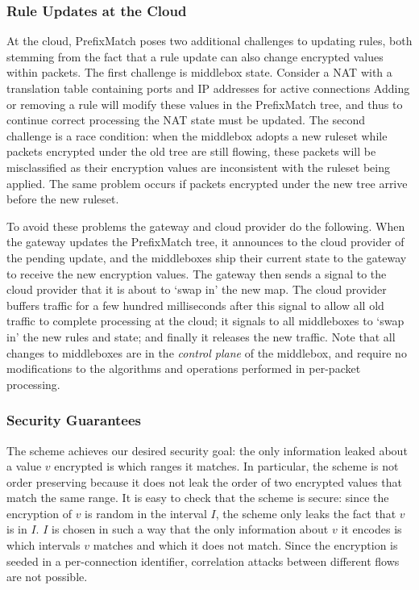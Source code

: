 \subsubsection{Rule Updates at the Cloud}
\label{sec:updates}
At the cloud, PrefixMatch poses two additional challenges to updating rules, both stemming from the fact that a rule update can also change encrypted values within packets.
The first challenge is middlebox state. Consider a NAT with a translation table containing ports and IP addresses for active connections
Adding or removing a rule will modify these values in the PrefixMatch tree, and thus to continue correct processing the NAT state must be updated.
The second challenge is a race condition: when the middlebox adopts a new ruleset while packets encrypted under the old tree are still flowing, these packets will be misclassified as their encryption values are inconsistent with the ruleset being applied. 
The same problem occurs if packets encrypted under the new tree arrive before the new ruleset.

To avoid these problems the gateway and cloud provider do the following. 
When the gateway updates the PrefixMatch tree, it announces to the cloud provider of the pending update, and the middleboxes ship their current state to the gateway to receive the new encryption values.
The gateway then sends a signal to the cloud provider that it is about to `swap in' the new map. 
The cloud provider buffers traffic for a few hundred milliseconds after this signal to allow all old traffic to complete processing at the cloud; it signals to all middleboxes to `swap in' the new rules and state; and finally it releases the new traffic.
Note that all changes to middleboxes are in the {\it control plane} of the middlebox, and require no modifications to the algorithms and operations performed in per-packet processing. 

\subsubsection{Security Guarantees}
The scheme achieves our desired security goal: the only information leaked about a value $v$ encrypted is which ranges it matches. 
In particular, the scheme is not order preserving because it does not leak the order of two encrypted values that match the same range. It is easy to check that the scheme is secure: since the encryption of $v$ is random in the interval $I$, the scheme only leaks the fact that $v$ is in $I$. $I$ is chosen in such a way that the only information about $v$ it encodes is which intervals $v$ matches and which it does not match. 
%
Since the encryption is seeded in a per-connection identifier, correlation attacks between different flows are not possible. 

